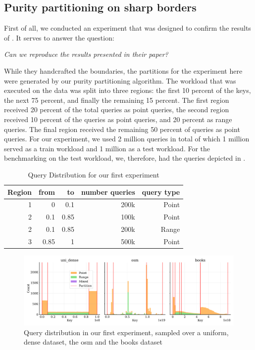 \subsection{Purity partitioning on sharp borders}
First of all, we conducted an experiment that was designed to confirm the results of \citeauthor{Dittrich2021} \cite[Optimized vs Heuristic Indexes]{Dittrich2021}. It serves to answer the question: 

\begin{center}
    \textit{Can we reproduce the results presented in their paper?}
\end{center}

\noindent While they handcrafted the boundaries, the partitions for the experiment here were generated by our purity partitioning algorithm. The workload that was executed on the data was split into three regions: the first 10 percent of the keys, the next 75 percent, and finally the remaining 15 percent. The first region received 20 percent of the total queries as point queries, the second region received 10 percent of the queries as point queries, and 20 percent as range queries. The final region received the remaining 50 percent of queries as point queries. For our experiment, we used 2 million queries in total of which 1 million served as a train workload and 1 million as a test workload. For the benchmarking on the test workload, we, therefore, had the queries depicted in .

\begin{table}
\centering
\begin{tabular}{rrrrr}
\hline
Region & from & to   & number queries & query type \\ \hline
1      & 0    & 0.1  & 200k           & Point      \\
2      & 0.1  & 0.85 & 100k           & Point      \\
2      & 0.1  & 0.85 & 200k           & Range      \\
3      & 0.85 & 1    & 500k           & Point      \\ \hline
\end{tabular}
\caption{Query Distribution for our first experiment}
\label{tab:poc_wkl}
\end{table}

\begin{figure}
    \centering
    \includegraphics[width=\textwidth]{figures/exp1_query_dist.pdf}
    \caption[uniform, osm and books query distribution after sharp boundary sampling]{Query distribution in our first experiment, sampled over a uniform, dense dataset, the osm and the books dataset}
    \label{fig:poc_dist}
\end{figure}

